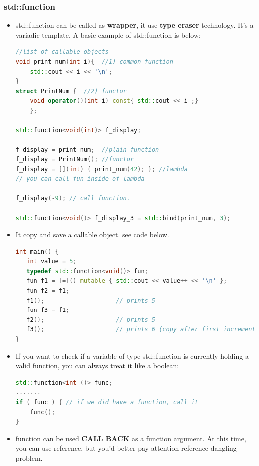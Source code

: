 \documentclass[a4paper,12pt,twoside]{book}
\begin{document}
\subsubsection{std::function}
\begin{itemize}

\item std::function can be called as \textbf{wrapper}, it use \textbf{type eraser} technology. It's a variadic template. A basic example of std::function is below:
 
\begin{lstlisting}[frame=single, language=c++]
//list of callable objects
void print_num(int i){  //1) common function
    std::cout << i << '\n';
}
struct PrintNum {  //2) functor
    void operator()(int i) const{ std::cout << i ;}
    };

std::function<void(int)> f_display;

f_display = print_num;  //plain function
f_display = PrintNum(); //functor
f_display = [](int) { print_num(42); }; //lambda
// you can call fun inside of lambda

f_display(-9); // call function.

std::function<void()> f_display_3 = std::bind(print_num, 3);
\end{lstlisting}

\item It copy and save a callable object. see code below.
\begin{lstlisting}[frame=single, language=c++]
int main() {
   int value = 5;
   typedef std::function<void()> fun;
   fun f1 = [=]() mutable { std::cout << value++ << '\n' };
   fun f2 = f1;
   f1();                    // prints 5
   fun f3 = f1;
   f2();                    // prints 5
   f3();                    // prints 6 (copy after first increment)
}
\end{lstlisting}

\item If you want to check if a variable of type std::function is currently holding a valid function, you can always treat it like a boolean:
\begin{lstlisting}[frame=single, language=c++]
std::function<int ()> func;
.......
if ( func ) { // if we did have a function, call it
    func();
}
\end{lstlisting}

\item function can be used \textbf{CALL BACK} as a function argument. At this time, you can use reference, but you'd better pay attention reference dangling problem. 


\end{itemize}
\end{document}
